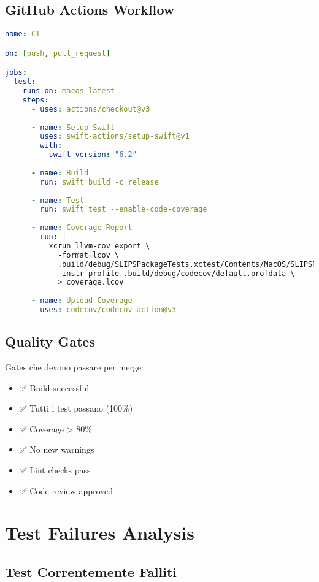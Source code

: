 \subsection{GitHub Actions Workflow}

\begin{lstlisting}[language=YAML]
name: CI

on: [push, pull_request]

jobs:
  test:
    runs-on: macos-latest
    steps:
      - uses: actions/checkout@v3
      
      - name: Setup Swift
        uses: swift-actions/setup-swift@v1
        with:
          swift-version: "6.2"
      
      - name: Build
        run: swift build -c release
      
      - name: Test
        run: swift test --enable-code-coverage
      
      - name: Coverage Report
        run: |
          xcrun llvm-cov export \
            -format=lcov \
            .build/debug/SLIPSPackageTests.xctest/Contents/MacOS/SLIPSPackageTests \
            -instr-profile .build/debug/codecov/default.profdata \
            > coverage.lcov
      
      - name: Upload Coverage
        uses: codecov/codecov-action@v3
\end{lstlisting}

\subsection{Quality Gates}

Gates che devono passare per merge:

\begin{itemize}
\item ✅ Build successful
\item ✅ Tutti i test passano (100\%)
\item ✅ Coverage > 80\%
\item ✅ No new warnings
\item ✅ Lint checks pass
\item ✅ Code review approved
\end{itemize}

\section{Test Failures Analysis}

\subsection{Test Correntemente Falliti}

